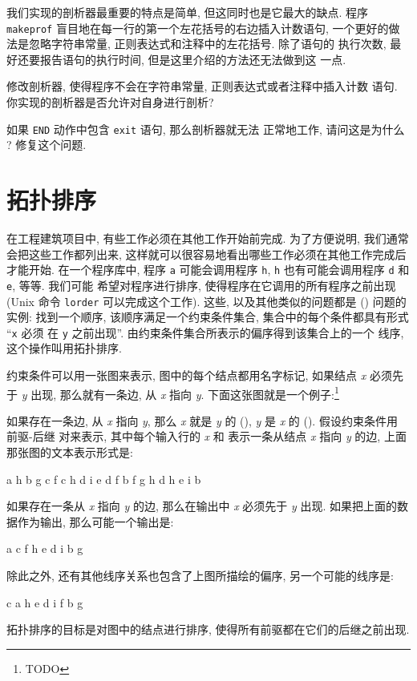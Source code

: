 我们实现的剖析器最重要的特点是简单, 但这同时也是它最大的缺点. 程序 
\texttt{makeprof} 盲目地在每一行的第一个左花括号的右边插入计数语句,
一个更好的做法是忽略字符串常量, 正则表达式和注释中的左花括号. 除了语句的
执行次数, 最好还要报告语句的执行时间, 但是这里介绍的方法还无法做到这
一点.

\begin{exercise}
    修改剖析器, 使得程序不会在字符串常量, 正则表达式或者注释中插入计数
    语句. 你实现的剖析器是否允许对自身进行剖析?
\end{exercise}

\begin{exercise}
    如果 \texttt{END} 动作中包含 \texttt{exit} 语句, 那么剖析器就无法
    正常地工作, 请问这是为什么 ? 修复这个问题.
\end{exercise}

\section{拓扑排序}
\label{sec:topological_sorting}

在工程建筑项目中, 有些工作必须在其他工作开始前完成. 为了方便说明, 我们通常
会把这些工作都列出来, 这样就可以很容易地看出哪些工作必须在其他工作完成后
才能开始. 在一个程序库中, 程序 \texttt{a} 可能会调用程序 \texttt{h},
\texttt{h} 也有可能会调用程序 \texttt{d}  和 \texttt{e}, 等等. 我们可能
希望对程序进行排序, 使得程序在它调用的所有程序之前出现 (Unix 命令
\texttt{lorder} 可以完成这个工作). 这些, 以及其他类似的问题都是
 () 问题的实例: 找到一个顺序,
该顺序满足一个约束条件集合, 集合中的每个条件都具有形式 ``\texttt{x} 必须
在 \texttt{y} 之前出现''. 由约束条件集合所表示的偏序得到该集合上的一个
线序, 这个操作叫用拓扑排序.

约束条件可以用一张图来表示, 图中的每个结点都用名字标记, 如果结点 \textit{x}
必须先于 \textit{y} 出现, 那么就有一条边, 从 \textit{x} 指向 \textit{y}.
下面这张图就是一个例子:\footnote{TODO}

如果存在一条边, 从 \textit{x} 指向 \textit{y}, 那么 \textit{x} 就是
\textit{y} 的  (), \textit{y} 是 \textit{x}
的  (). 假设约束条件用 前驱-后继 对来表示,
其中每个输入行的 \textit{x} 和  表示一条从结点 \textit{x} 指向 
\textit{y} 的边, 上面那张图的文本表示形式是:
\begin{file}
    a   h
    b   g
    c   f
    c   h
    d   i
    e   d
    f   b
    f   g
    h   d
    h   e
    i   b
\end{file}

如果存在一条从 \textit{x} 指向 \textit{y} 的边, 那么在输出中 \textit{x}
必须先于 \textit{y} 出现. 如果把上面的数据作为输出, 那么可能一个输出是:
\begin{file}
    a c f h e d i b g
\end{file}
除此之外, 还有其他线序关系也包含了上图所描绘的偏序, 另一个可能的线序是:
\begin{file}
    c a h e d i f b g
\end{file}

拓扑排序的目标是对图中的结点进行排序, 使得所有前驱都在它们的后继之前出现.
